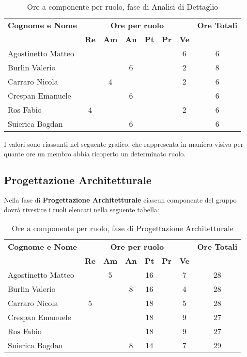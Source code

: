 \begin{table}[h]
	\centering
	\begin{tabular}{|l|c|c|c|c|c|c|c|}
		\toprule
		\textbf{Cognome e Nome} & \multicolumn{6}{c}{\textbf{Ore per ruolo}} & \textbf{Ore Totali} \\
		& \textbf{Re} & \textbf{Am} & \textbf{An} & \textbf{Pt} & \textbf{Pr} & \textbf{Ve} & \\
		
		\midrule
		Agostinetto Matteo & & & & & & 6 & 6 \\
		Burlin Valerio & & & 6 & & & 2 & 8 \\ 
		Carraro Nicola & & 4 & & & & 2 & 6 \\
		Crespan Emanuele & & & 6 & & & & 6 \\
		Ros Fabio & 4 & & & & & 2 & 6 \\
		Suierica Bogdan & & & 6 & & & & 6 \\
		
		\bottomrule
	\end{tabular}
	\caption{Ore a componente per ruolo, fase di Analisi di Dettaglio}
\end{table}

I valori sono riassunti nel seguente grafico, che rappresenta in maniera visiva per quante ore un membro abbia ricoperto un determinato ruolo.

\subsection{Progettazione Architetturale}
Nella fase di \textbf{Progettazione Architetturale} ciascun componente del gruppo dovrà rivestire i ruoli elencati nella seguente tabella:

\begin{table}[h]
	\centering
	\begin{tabular}{|l|c|c|c|c|c|c|c|}
		\toprule
		\textbf{Cognome e Nome} & \multicolumn{6}{c}{\textbf{Ore per ruolo}} & \textbf{Ore Totali} \\
		& \textbf{Re} & \textbf{Am} & \textbf{An} & \textbf{Pt} & \textbf{Pr} & \textbf{Ve} & \\
		
		\midrule
		Agostinetto Matteo & & 5 & & 16 & & 7 & 28 \\
		Burlin Valerio & & & 8 & 16 & & 4 & 28 \\ 
		Carraro Nicola & 5 & & & 18 & & 5 & 28 \\
		Crespan Emanuele & & & & 18 & & 9 & 27 \\
		Ros Fabio & & & & 18 & & 9 & 27 \\
		Suierica Bogdan & & & 8 & 14 & & 7 & 29 \\
		
		\bottomrule
	\end{tabular}
	\caption{Ore a componente per ruolo, fase di Progettazione Architetturale}
\end{table}

